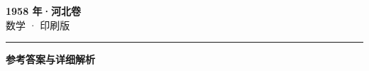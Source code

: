 \documentclass[zihao=5, a4paper]{ctexart}
\begin{document}
\begin{center}
  {\Large\bfseries 1958 年·河北卷}\\[4pt]
  {\large 数学 · 印刷版}
\end{center}
\medskip
{}

\par\bigskip\hrule\bigskip
{}
\begin{center}{\large\bfseries 参考答案与详细解析}\end{center}
\smallskip

\end{document}

